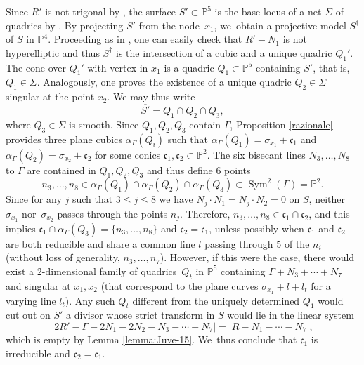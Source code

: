 \documentclass[JEP,XML,SOM,Unicode,NoEqCountersInSection,published]{cedram}
\theoremstyle{plain}
\theoremstyle{definition}
\DeclareMathOperator{\Sym}{Sym}
\newcommand\PP{{\mathbb P}}
\begin{document}
Since $R'$ is not trigonal by \cite[Prop.\,5.6]{DL}, the surface $\overline{S'}\subset \PP^5$ is the base locus of a net $\Sigma$ of quadrics by \cite[Ex.\,VIII.22(11)]{Be}. By projecting $\overline{S'}$ from the node~$x_1$, we~obtain a projective model $S^\dagger$ of $S$ in $\mathbb P^4$. Proceeding as in \cite[Prop.\,5.6]{DL}, one can easily check that $R'-N_1$ is not hyperelliptic and thus $S^\dagger$ is the intersection of a cubic and a unique quadric $Q_1'$. The cone over $Q_1'$ with vertex in $x_1$ is a quadric $Q_1\subset \PP^5$ containing $\overline{S'}$, that is, $Q_1\in \Sigma$. Analogously, one proves the existence of a unique quadric $Q_2\in \Sigma$ singular at the point $x_2$.
We may thus write
\[
\overline{S'}=Q_1\cap Q_2\cap Q_3,
\]
where $Q_3\in \Sigma$ is smooth. Since $Q_1,Q_2,Q_3$ contain $\Gamma$, Proposition \ref{razionale} provides three plane cubics $\alpha_\Gamma(Q_i)$ such that $\alpha_\Gamma(Q_1)=\sigma_{x_1}+\mathfrak{c}_1$ and $\alpha_\Gamma(Q_2)=\sigma_{x_2}+\mathfrak{c}_2$ for some conics $\mathfrak{c}_1,\mathfrak{c}_2\subset \PP^2$. The six bisecant lines $N_3,\ldots,N_8$ to $\Gamma$ are contained in $Q_1,Q_2,Q_3$ and thus define $6$ points
\[
n_3,\ldots,n_8\in\alpha_\Gamma(Q_1)\cap \alpha_\Gamma(Q_2)\cap\alpha_\Gamma(Q_3)\subset\Sym^2(\Gamma)=\PP^2.
\]
Since for any $j$ such that $3\leq j\leq 8$ we have $N_j\cdot N_1=N_j\cdot N_2=0$ on $S$, neither~$\sigma_{x_1}$ nor~$\sigma_{x_2}$ passes through the points $n_j$. Therefore, $n_3,\ldots,n_8\in \mathfrak{c}_1\cap \mathfrak{c}_2$, and this implies $\mathfrak{c}_1\cap \alpha_{\Gamma}(Q_3)=\{ n_3,\ldots,n_8 \}$ and $\mathfrak{c}_2=\mathfrak{c}_1$, unless possibly when $\mathfrak{c}_1$ and $\mathfrak{c}_2$ are both reducible and share a common line $l$ passing through $5$ of the $n_i$ (without loss of generality, $n_3,\ldots,n_7$). However, if this were the case, there would exist a $2$-dimensional family of quadrics~$Q_t$ in $\PP^5$ containing $\Gamma+N_3+\cdots+N_7$ and singular at $x_1, x_2$ (that correspond to the plane curves $\sigma_{x_1}+l+l_t$ for a varying line $l_t$). Any such $Q_t$ different from the uniquely determined $Q_1$ would cut out on $\overline{S'}$ a divisor whose strict transform in $S$ would lie in the linear system
\begin{equation*}
|2R'-\Gamma- 2N_1-2N_2-N_3-\cdots-N_7|=|R-N_1-\cdots-N_7|,
\end{equation*}
which is empty by Lemma \ref{lemma:Juve-15}. We~thus conclude that $\mathfrak{c}_1$ is irreducible and $\mathfrak{c}_2=\mathfrak{c}_1$.
\end{document}
